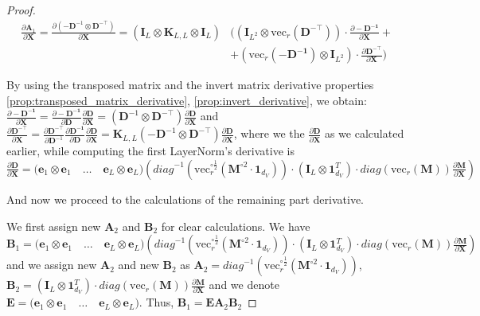 \documentclass{article}
\begin{document}
\begin{proof}
\begin{align*}
    \frac{\partial \mathbf{A}_1}{\partial \mathbf{X}} = \frac{\partial \left(-\mathbf{D}^{-1} \otimes \mathbf{D}^{-\top} \right)}{\partial \mathbf{X}} = \left(\mathbf{I}_L \otimes \mathbf{K}_{L, L} \otimes \mathbf{I}_L \right) &\Big((\mathbf{I}_{L^2} \otimes \mathrm{vec}_r(\mathbf{\mathbf{D}^{-\top}})) \cdot \frac{\partial -\mathbf{\mathbf{D}^{-1}}}{\partial \mathbf{X}}+ \\
    &+ (\mathrm{vec}_r(-\mathbf{\mathbf{D}^{-1}}) \otimes \mathbf{I}_{L^2}) \cdot \frac{\partial \mathbf{\mathbf{D}^{-\top}}}{\partial \mathbf{X}} \Big)
\end{align*}

By using the transposed matrix and the invert matrix derivative properties \ref{prop:transposed_matrix_derivative}, \ref{prop:invert_derivative}, we obtain: $\frac{\partial -\mathbf{\mathbf{D}^{-1}}}{\partial \mathbf{X}} = \frac{\partial -\mathbf{\mathbf{D}^{-1}}}{\partial \mathbf{D}}\frac{\partial \mathbf{D}}{\partial \mathbf{X}} = \left( \mathbf{D}^{-1} \otimes \mathbf{D}^{-\top}\right) \frac{\partial \mathbf{D}}{\partial \mathbf{X}}$ and $\frac{\partial \mathbf{\mathbf{D}^{-\top}}}{\partial \mathbf{X}} = \frac{\partial \mathbf{\mathbf{D}^{-\top}}}{\partial \mathbf{D}^{-1}}\frac{\partial \mathbf{\mathbf{D}^{-1}}}{\partial \mathbf{D}} \frac{\partial \mathbf{\mathbf{D}}}{\partial \mathbf{X}} = \mathbf{K}_{L, L} \left(-\mathbf{D}^{-1} \otimes \mathbf{D}^{-\top} \right) \frac{\partial \mathbf{\mathbf{D}}}{\partial \mathbf{X}}$, where we the $\frac{\partial \mathbf{\mathbf{D}}}{\partial \mathbf{X}}$ as we calculated earlier, while computing the first LayerNorm's derivative is $\frac{\partial \mathbf{\mathbf{D}}}{\partial \mathbf{X}} = \Big(\mathbf{e}_1 \otimes \mathbf{e}_1 \quad \dots  \quad \mathbf{e}_L \otimes \mathbf{e}_L\Big)\left(\textit{diag}^{-1}(\mathrm{vec}_r^{\circ \frac{1}{2}}(\mathbf{M}^{\circ{2}}\cdot\mathbf{1}_{d_V}))\cdot (\mathbf{I}_L \otimes \mathbf{1}^T_{d_V})\cdot \textit{diag}(\mathrm{vec}_r (\mathbf{M}))\frac{\partial \mathbf{M}}{\partial \mathbf{X}}\right)$


And now we proceed to the calculations of the remaining part derivative. 

We first assign new $\mathbf{A}_2$ and $\mathbf{B}_2$ for clear calculations. We have $\mathbf{B}_1 = \Big(\mathbf{e}_1 \otimes \mathbf{e}_1 \quad \dots  \quad \mathbf{e}_L \otimes \mathbf{e}_L\Big)\left(\textit{diag}^{-1}(\mathrm{vec}_r^{\circ \frac{1}{2}}(\mathbf{M}^{\circ{2}}\cdot\mathbf{1}_{d_V}))\cdot (\mathbf{I}_L \otimes \mathbf{1}^T_{d_V})\cdot \textit{diag}(\mathrm{vec}_r (\mathbf{M}))\frac{\partial \mathbf{M}}{\partial \mathbf{X}}\right)$ and we assign new $\mathbf{A}_2$ and new $\mathbf{B}_2$ as $\mathbf{A}_2 = \textit{diag}^{-1}(\mathrm{vec}_r^{\circ \frac{1}{2}}(\mathbf{M}^{\circ{2}}\cdot\mathbf{1}_{d_V}))$, $\mathbf{B}_2 = (\mathbf{I}_L \otimes \mathbf{1}^T_{d_V})\cdot \textit{diag}(\mathrm{vec}_r (\mathbf{M}))\frac{\partial \mathbf{M}}{\partial \mathbf{X}}$ and we denote $\mathbf{E} = \Big(\mathbf{e}_1 \otimes \mathbf{e}_1 \quad \dots  \quad \mathbf{e}_L \otimes \mathbf{e}_L\Big)$. Thus, $\mathbf{B}_1 = \mathbf{E} \mathbf{A}_2 \mathbf{B}_2$


\end{proof}
\end{document}

